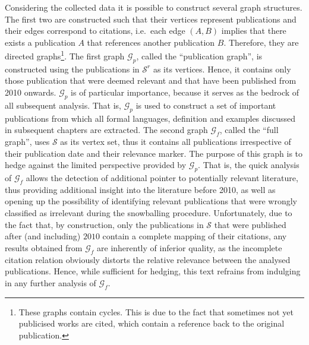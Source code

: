 \documentclass[11pt,a4paper]{book}
\theoremstyle{definition}
\theoremstyle{definition}
\theoremstyle{definition}
\theoremstyle{remark}
\newcommand{\xset}{\mathcal{S}}
\newcommand{\tgraph}{\mathcal{G}_{f}}
\newcommand{\pgraph}{\mathcal{G}_{p}}
\begin{document}
Considering the collected data it is possible to construct several graph structures.
The first two are constructed such that their vertices represent publications and their edges correspond to citations, i.e.\ each edge $(A,B)$ implies that there exists a publication $A$ that references another publication $B$. Therefore, they are directed graphs\footnote{These graphs contain cycles. This is due to the fact that sometimes not yet publicised works are cited, which contain a reference back to the original publication.}.
The first graph $\pgraph$, called the ``publication graph'', is constructed using the publications in $\xset^r$
as its vertices. Hence, it contains only those publication that were deemed relevant and that have been published from 2010 onwards. $\pgraph$ is of particular importance, because it serves as the bedrock of all subsequent analysis. That is,  $\pgraph$ is used to construct a set of important publications from which all formal languages, definition and examples discussed in subsequent chapters are extracted.
The second graph $\tgraph$, called the ``full graph'', uses $\xset$ as its vertex set, thus it contains all publications irrespective of their publication date and their relevance marker. The purpose of this graph is to hedge against the limited perspective provided by $\pgraph$. That is, the quick analysis of $\tgraph$ allows the detection of additional pointer to potentially relevant literature, thus providing additional insight into the literature before 2010, as well as opening up the possibility of identifying relevant publications that were wrongly classified as irrelevant during the snowballing procedure. Unfortunately, due to the fact that, by construction, only the publications in $\xset$ that were published after (and including) $2010$ contain a complete mapping of their citations, any results obtained from $\tgraph$ are inherently of inferior quality, as the incomplete citation relation obviously distorts the relative relevance between the analysed publications. Hence, while sufficient for hedging, this text refrains from indulging in any further analysis of $\tgraph$. 
%
\end{document}
